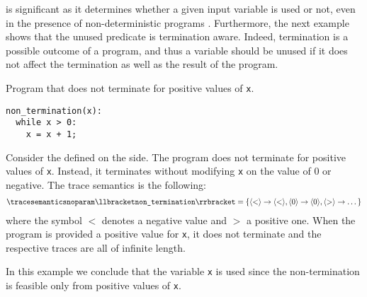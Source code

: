  is significant as it determines whether a given input variable is used or not, even in the presence of non-deterministic programs%
.
Furthermore, the next example shows that the unused predicate is termination aware.
Indeed, termination is a possible outcome of a program, and thus a variable should be unused if it does not affect the termination as well as the result of the program.

\begin{example}
  \begin{marginlisting}
    \caption{Program that does not terminate for positive values of \texttt{x}.}
    \vspace{2\lineheight}
  \begin{lstlisting}
non_termination(x):
  while x > 0:
    x = x + 1;
\end{lstlisting}
  \end{marginlisting}
  Consider the  defined on the side. The program does not terminate for positive values of \texttt{x}. Instead, it terminates without modifying \texttt{x} on the value of $0$ or negative. The trace semantics is the following:
  \begin{align*}
    \tracesemanticsnoparam\semanticsof{\texttt{non\_termination}}
    =
    \{
      \langle{<}\rangle\rightarrow\langle{<}\rangle,
      \langle{0}\rangle\rightarrow\langle{0}\rangle,
      \langle{>}\rangle\rightarrow\dots
    \}
  \end{align*}
  where the symbol $<$ denotes a negative value and $>$ a positive one. When the program is provided a positive value for \texttt{x}, it does not terminate and the respective traces are all of infinite length.

  In this example we conclude that the variable \texttt{x} is used since the non-termination is feasible only from positive values of \texttt{x}.
\end{example}

